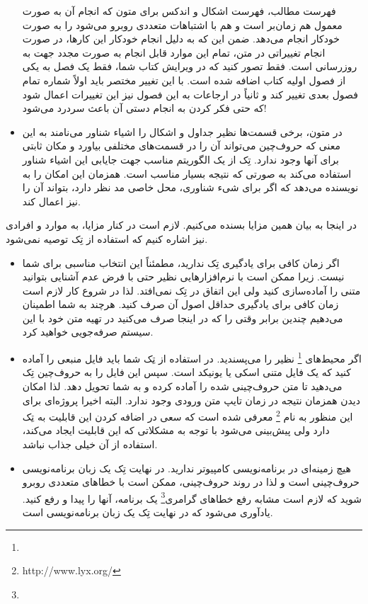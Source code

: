 \begin{itemize}
 فهرست مطالب، فهرست اشکال و اندکس برای متون که انجام آن به صورت معمول هم 
 زمان‌بر است و هم با اشتباهات متعددی روبرو می‌شود را به صورت خودکار انجام می‌دهد.
 ضمن این که به دلیل انجام خودکار
 این کارها، در صورت انجام تغییراتی در متن، تمام این موارد قابل انجام به صورت مجدد جهت
 به روزرسانی است. فقط تصور کنید که در ویرایش کتاب شما، فقط یک فصل به یکی از
 فصول اولیه کتاب اضافه شده است. با این تغییر مختصر باید اولاً شماره تمام فصول بعدی
 تغییر کند و ثانیاً در ارجاعات به این فصول نیز این تغییرات اعمال شود که حتی فکر کردن 
 به انجام دستی  آن باعث سردرد می‌شود!
 \item در متون، برخی قسمت‌ها نظیر جداول و اشکال را اشیاء شناور می‌نامند به این معنی
 که حروف‌چین می‌تواند آن را در قسمت‌های مختلفی بیاورد و مکان ثابتی برای آنها وجود ندارد.
 تِک از یک الگوریتم مناسب جهت جایابی این اشیاء شناور استفاده می‌کند به صورتی که
 نتیجه بسیار مناسب است. همزمان این امکان را به نویسنده می‌دهد که اگر برای شیء شناوری،
 محل خاصی مد نظر دارد، بتواند آن را نیز اعمال کند.
   \end{itemize}
   
   در اینجا به بیان همین مزایا بسنده می‌کنیم. لازم است در کنار مزایا، به موارد و افرادی 
   نیز اشاره    کنیم که  استفاده از تِک توصیه نمی‌شود. 
   \begin{itemize}
   \item  اگر زمان کافی برای یادگیری تِک ندارید، مطمئناً این انتخاب مناسبی
   برای شما نیست. زیرا ممکن است با نرم‌افزارهایی نظیر  حتی با فرض
   عدم آشنایی بتوانید متنی را آماده‌سازی کنید ولی این اتفاق در تِک نمی‌افتد. لذا در شروع
   کار لازم است زمان کافی برای یادگیری حداقل اصول آن صرف کنید. هرچند به شما
   اطمینان می‌دهیم چندین برابر وقتی را که در اینجا صرف می‌کنید در تهیه متن خود
   با این سیستم صرفه‌جویی خواهید کرد.
   \item اگر محیط‌های \footnote{}
   نظیر  را می‌پسندید. در استفاده از تِک شما باید فایل منبعی را آماده کنید
   که یک فایل متنی اسکی یا یونیکد است. سپس این فایل را به حروف‌چین تِک 
   می‌دهید تا متن حروف‌چینی شده را آماده کرده و به شما تحویل دهد. لذا امکان دیدن همزمان
   نتیجه در زمان تایپ متن ورودی وجود ندارد. البته اخیرا پروژه‌ای برای این 
   منظور به نام \footnote{http://www.lyx.org/}
   معرفی شده است که سعی در اضافه کردن این قابلیت 
   به  تِک  دارد ولی پیش‌بینی می‌شود با توجه به مشکلاتی که این قابلیت ایجاد می‌کند،
   استفاده از آن خیلی جذاب نباشد.
   \item هیچ زمینه‌ای در برنامه‌نویسی کامپیوتر ندارید. در نهایت تِک یک زبان برنامه‌نویسی
   حروف‌چینی است و لذا در روند حروف‌چینی، ممکن است با خطاهای متعددی 
روبرو شوید که لازم است مشابه رفع خطاهای گرامری\footnote{}
یک برنامه، آنها را پیدا  و رفع کنید.   یادآوری می‌شود که در نهایت تِک یک زبان برنامه‌نویسی است.
   \end{itemize}


